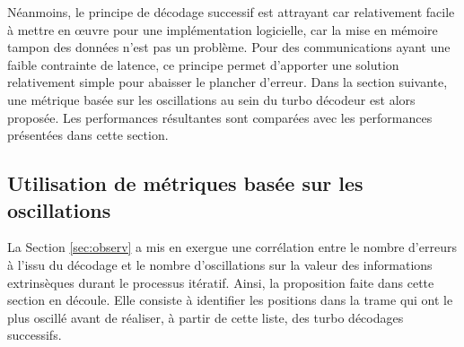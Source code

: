 Néanmoins, le principe de décodage successif est attrayant car relativement facile à mettre en œuvre pour une 
implémentation logicielle, car la mise en mémoire tampon des données n'est pas un problème.
Pour des communications ayant une faible contrainte de latence, ce principe permet d'apporter une solution relativement
simple pour abaisser le plancher d'erreur. 
Dans la section suivante, une métrique basée sur les oscillations au sein du turbo décodeur est alors proposée. Les performances
résultantes sont comparées avec les performances présentées dans cette section.

\subsection{Utilisation de métriques basée sur les oscillations}
La Section \ref{sec:observ} a mis en exergue une corrélation entre le nombre d'erreurs à l'issu du décodage et 
le nombre d'oscillations sur la valeur des informations extrinsèques durant le processus itératif. Ainsi, la proposition faite dans cette section en découle. Elle 
consiste à identifier les positions dans la trame qui ont le plus oscillé avant de réaliser, à partir de cette liste, des turbo décodages successifs.


